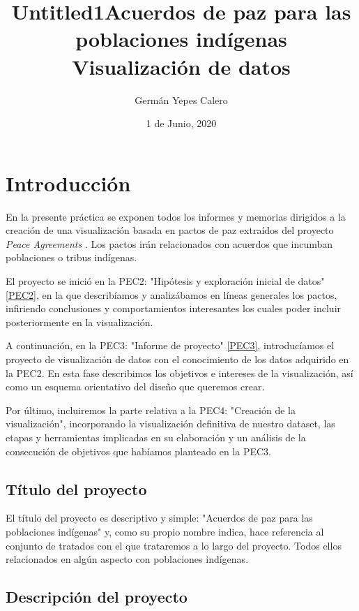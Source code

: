 \documentclass[11pt]{article}
\title{Untitled1}
\author{Germán Yepes Calero}
\title{Acuerdos de paz para las poblaciones indígenas
\\ \large Visualización de datos}
\date{1 de Junio, 2020}
\begin{document}
\maketitle

\pagebreak

{
  \hypersetup{linkcolor=black}
  \tableofcontents
}

\pagebreak 

\section{Introducción}

En la presente práctica se exponen todos los informes y memorias dirigidos a la creación de una visualización basada en pactos de paz extraídos del proyecto \emph{Peace Agreements} \cite{peace}. Los pactos irán relacionados con acuerdos que incumban poblaciones o tribus indígenas.

El proyecto se inició en la PEC2: "Hipótesis y exploración inicial de datos" \ref{PEC2}, en la que describíamos y analizábamos 
en líneas generales los pactos, infiriendo conclusiones y comportamientos interesantes los cuales poder incluir posteriormente en la visualización.

A continuación, en la PEC3: "Informe de proyecto" \ref{PEC3}, introducíamos el proyecto de visualización de datos con el conocimiento de los datos adquirido en la PEC2. En esta fase describimos los objetivos e intereses de la visualización, así como un esquema orientativo del diseño que queremos crear. 

Por último, incluiremos la parte relativa a la PEC4: "Creación de la visualización", incorporando la visualización definitiva de nuestro dataset, las etapas y herramientas implicadas en su elaboración y un análisis de la consecución de objetivos que habíamos planteado en la PEC3.

\subsection{Título del proyecto}

El título del proyecto es descriptivo y simple: "Acuerdos de paz para las poblaciones indígenas" y, como su propio nombre indica, hace referencia al conjunto de tratados con el que trataremos a lo largo del proyecto. Todos ellos relacionados en algún aspecto con poblaciones indígenas. 

\subsection{Descripción del proyecto}
\end{document}
